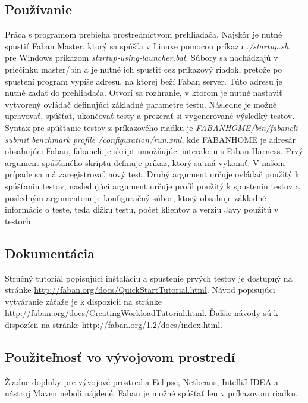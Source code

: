 \documentclass[12pt,oneside,final]{fithesis-utf8}
\newcommand\underscore[1]{\underline{\hspace{8pt}}}
\begin{document}
\subsection{Používanie}
Práca s programom prebieha prostredníctvom prehliadača. Najskôr je nutné spustiť Faban Master, ktorý sa spúšťa v Linuxe pomocou príkazu \textit{./startup.sh}, pre Windows príkazom \textit{startup-using-launcher.bat}. Súbory sa nachádzajú v priečinku master/bin a je nutné ich spustiť cez príkazový riadok, pretože po spustení program vypíše adresu, na ktorej beží Faban server. Túto adresu je nutné zadať do prehliadača. Otvorí sa rozhranie, v ktorom je nutné nastaviť vytvorený ovládač definujúci základné parametre testu. Následne je možné upravovať, spúšťať, ukončovať testy a prezerať si vygenerované výsledký testov. Syntax pre spúšťanie testov z príkazového riadku je \textit{FABAN\underscore{}HOME/bin/fabancli submit benchmark profile /configuration/run.xml}, kde FABAN\underscore{}HOME je adresár obsahujúci Faban, fabancli je skript umožňujúci interakciu s Faban Harness. Prvý argument spúšťaného skriptu definuje príkaz, ktorý sa má vykonať. V našom prípade sa má zaregistrovať nový test. Druhý argument určuje ovládač použitý k spúšťaniu testov, nasledujúci argument určuje profil použitý k spusteniu testov a posledným argumentom je konfiguračný súbor, ktorý obsahuje základné informácie o teste, teda dĺžku testu, počet klientov a verziu Javy použitú v testoch.

\subsection{Dokumentácia}
Stručný tutoriál popisujúci inštaláciu a spustenie prvých testov je dostupný na stránke \url{http://faban.org/docs/QuickStartTutorial.html}. Návod popisujúci vytváranie záťaže je k dispozícii na stránke \url{http://faban.org/docs/CreatingWorkloadTutorial.html}. Ďalšie návody sú k dispozícii na stránke \url{http://faban.org/1.2/docs/index.html}.

\subsection{Použiteľnosť vo vývojovom prostredí}
Žiadne doplnky pre vývojové prostredia Eclipse, Netbeans, IntelliJ IDEA a nástroj Maven neboli nájdené. Faban je možné spúšťať len v príkazovom riadku.
\end{document}
